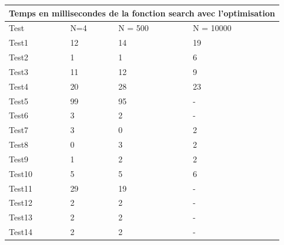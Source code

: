 \documentclass[utf8]{article}
\begin{document}
\begin{large}
\begin{tabular}{ |p{3cm}||p{3cm}|p{3cm}|p{3cm}|  }
        \hline
    \end{tabular}

    \begin{tabular}{ |p{3cm}||p{3cm}|p{3cm}|p{3cm}|  }
        \hline
        \multicolumn{4}{|c|}{Temps en millisecondes de la fonction search avec l'optimisation} \\
        \hline
        Test   & N=4 & N = 500 & N = 10000                                                     \\
        \hline
        Test1  & 12  & 14      & 19                                                            \\
        Test2  & 1   & 1       & 6                                                             \\
        Test3  & 11  & 12      & 9                                                             \\
        Test4  & 20  & 28      & 23                                                            \\
        Test5  & 99  & 95      & -                                                             \\
        Test6  & 3   & 2       & -                                                             \\
        Test7  & 3   & 0       & 2                                                             \\
        Test8  & 0   & 3       & 2                                                             \\
        Test9  & 1   & 2       & 2                                                             \\
        Test10 & 5   & 5       & 6                                                             \\
        Test11 & 29  & 19      & -                                                             \\
        Test12 & 2   & 2       & -                                                             \\
        Test13 & 2   & 2       & -                                                             \\
        Test14 & 2   & 2       & -                                                             \\
        \hline
    \end{tabular}




\end{large}
\end{document}

